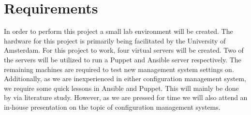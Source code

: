 \section{Requirements}\label{sec:requirements}
In order to perform this project a small lab environment will be created. The hardware for this project is primarily being facilitated by the University of Amsterdam. For this project to work, four virtual servers will be created. Two of the servers will be utilized to run a Puppet and Ansible server respectively. The remaining machines are required to test new management system settings on. Additionally, as we are inexperienced in either configuration management system, we require some quick lessons in Ansible and Puppet. This will mainly be done by via literature study. However, as we are pressed for time we will also attend an in-house presentation on the topic of configuration management systems.
